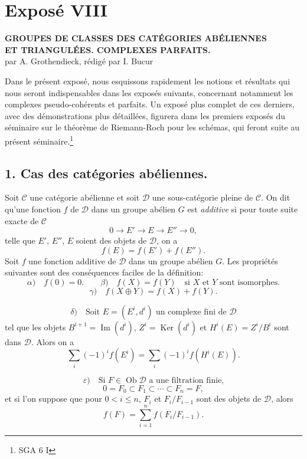 \documentclass[11pt]{article}
\providecommand{\Ob}{\operatorname{ob}}
\providecommand{\cC}{\mathcal C}
\providecommand{\Ob}{\operatorname{ob}}
\providecommand{\cC}{\mathcal C}
\providecommand{\cD}{\mathcal D}
\providecommand{\Ob}{\operatorname{Ob}}
\providecommand{\Ob}{\operatorname{ob}}
\providecommand{\Ob}{\operatorname{Ob}}
\begin{document}
\newpage
\section*{Exposé VIII}
\renewcommand{\Ob}{\operatorname{Ob}}

\begin{center}
\textbf{GROUPES DE CLASSES DES CATÉGORIES ABÉLIENNES}\\
\textbf{ET TRIANGULÉES. COMPLEXES PARFAITS.}\\[1ex]
par A. Grothendieck, rédigé par I. Bucur
\end{center}

Dans le présent exposé, nous esquissons rapidement les notions et résultats qui nous seront indispensables dans les exposés suivants, concernant notamment les complexes pseudo-cohérents et parfaits. Un exposé plus complet de ces derniers, avec des démonstrations plus détaillées, figurera dans les premiers exposés du séminaire sur le théorème de Riemann-Roch pour les schémas, qui feront suite au présent séminaire.\footnote{SGA 6 I}

\subsection*{1. Cas des catégories abéliennes.}

Soit $\cC$ une catégorie abélienne et soit $\cD$ une sous-catégorie pleine de $\cC$. On dit qu'une fonction $f$ de $\cD$ dans un groupe abélien $G$ est \emph{additive} si pour toute suite exacte de $\cC$
\[
0\longrightarrow E'\longrightarrow E\longrightarrow E''\longrightarrow 0,
\]
telle que $E'$, $E''$, $E$ soient des objets de $\cD$, on a
\[
f(E)=f(E')+f(E'').
\]
Soit $f$ une fonction additive de $\cD$ dans un groupe abélien $G$. Les propriétés suivantes sont des conséquences faciles de la définition:
\[
\alpha)\quad f(0)=0.\qquad
\beta)\quad f(X)=f(Y)\quad\text{si }X\text{ et }Y\text{ sont isomorphes.}
\]
\[
\gamma)\quad f(X\oplus Y)=f(X)+f(Y).
\]

\[
\delta)\quad
\text{Soit }E=(E^i,d^i)\text{ un complexe fini de }\cD
\]
tel que les objets $B^{i+1}=\operatorname{Im}(d^i)$, $Z^i=\operatorname{Ker}(d^i)$ et $H^i(E)=Z^i/B^i$ sont dans $\cD$. Alors on a
\[
\sum_i (-1)^i f(E^i)=\sum_i (-1)^i f(H^i(E)).
\]

\[
\varepsilon)\quad
\text{Si }F\in\Ob \cD\text{ a une filtration finie,}
\]
\[
0=F_0\subset F_1\subset\cdots\subset F_n=F,
\]
et si l'on suppose que pour $0<i\le n$, $F_i$ et $F_i/F_{i-1}$ sont des objets de $\cD$, alors
\[
f(F)=\sum_{i=1}^n f(F_i/F_{i-1}).
\]
\end{document}
